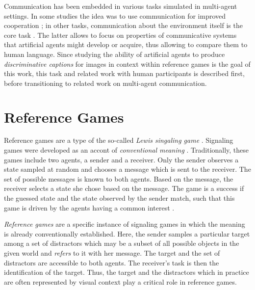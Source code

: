 Communication has been embedded in various tasks simulated in multi-agent settings. In some studies the idea was to use communication for improved cooperation \parencite[e.~g.,][]{foerster2016learning}; in other tasks, communication about the environment itself is the core task \parencite[e.~g.][]{lazaridou2018emergence}. The latter allows to focus on properties of communicative systems that artificial agents might develop or acquire, thus allowing to compare them to human language. Since studying the ability of artificial agents to produce \textit{discriminative captions} for images in context within reference games is the goal of this work, this task and related work with human participants is described first, before transitioning to related work on multi-agent communication.


\section{Reference Games}
\label{reference_games}

Reference games are a type of the so-called \textit{Lewis singaling game} \parencite{lewis1969convention, skyrms2010signals}.
Signaling games were developed as an accont of \textit{conventional meaning} \parencite{grice1975logic}. Traditionally, these games include two agents, a sender and a receiver. Only the sender observes a state sampled at random and chooses a message which is sent to the receiver. The set of possible messages is known to both agents. Based on the message, the receiver selects a state she chose based on the message. The game is a success if the guessed state and the state observed by the sender match, such that this game is driven by the agents having a common interest \parencite{lewis1969convention}. 

\textit{Reference games} are a specific instance of signaling games in which the meaning is already conventionally established. Here, the sender samples a particular target among a set of distractors which may be a subset of all possible objects in the given world and \textit{refers} to it with her message. The target and the set of distractors are accessible to both agents. The receiver's task is then the identification of the target. Thus, the target and the distractors which in practice are often represented by visual context play a critical role in reference games.

